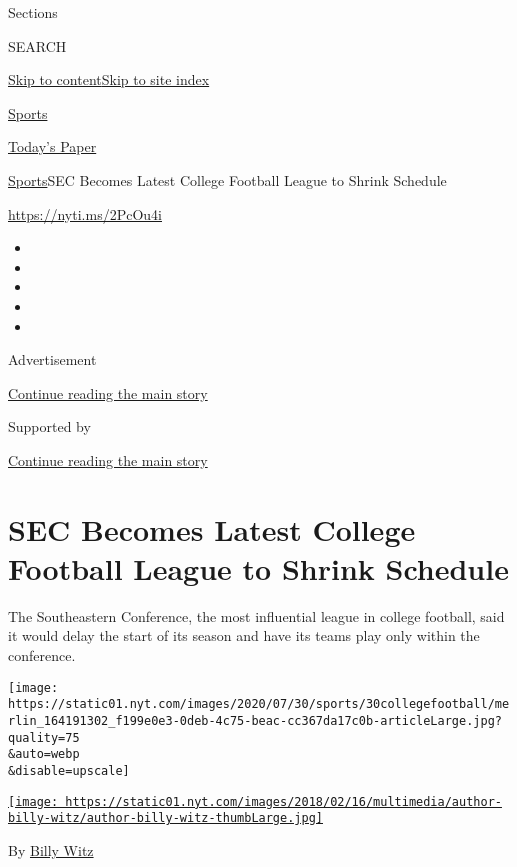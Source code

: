 Sections

SEARCH

\protect\hyperlink{site-content}{Skip to
content}\protect\hyperlink{site-index}{Skip to site index}

\href{https://www.nytimes.com/section/sports}{Sports}

\href{https://myaccount.nytimes.com/auth/login?response_type=cookie\&client_id=vi}{}

\href{https://www.nytimes.com/section/todayspaper}{Today's Paper}

\href{/section/sports}{Sports}\textbar{}SEC Becomes Latest College
Football League to Shrink Schedule

\url{https://nyti.ms/2PcOu4i}

\begin{itemize}
\item
\item
\item
\item
\item
\end{itemize}

Advertisement

\protect\hyperlink{after-top}{Continue reading the main story}

Supported by

\protect\hyperlink{after-sponsor}{Continue reading the main story}

\hypertarget{sec-becomes-latest-college-football-league-to-shrink-schedule}{%
\section{SEC Becomes Latest College Football League to Shrink
Schedule}\label{sec-becomes-latest-college-football-league-to-shrink-schedule}}

The Southeastern Conference, the most influential league in college
football, said it would delay the start of its season and have its teams
play only within the conference.

\texttt{[image: https://static01.nyt.com/images/2020/07/30/sports/30collegefootball/merlin\_164191302\_f199e0e3-0deb-4c75-beac-cc367da17c0b-articleLarge.jpg?quality=75\\\&auto=webp\\\&disable=upscale]}

\href{https://www.nytimes.com/by/billy-witz}{\texttt{[image: https://static01.nyt.com/images/2018/02/16/multimedia/author-billy-witz/author-billy-witz-thumbLarge.jpg]}}

By \href{https://www.nytimes.com/by/billy-witz}{Billy Witz}

